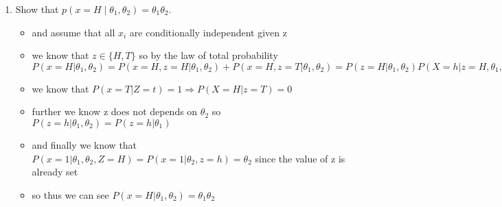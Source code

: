 \documentclass{article}
\theoremstyle{plain}
\theoremstyle{definition}
\begin{document}
\begin{enumerate}
  \setcounter{enumi}{\value{saveenum}}
\item Show that $p(x=H\mid \theta_1, \theta_2) = \theta_1 \theta_2$.
\begin{itemize}
    \color{blue}
    \item and assume that all $x_i$ are conditionally independent given z 
    \item we know that $z\in \{H,T\}$ so by the law of total probability $P(x=H|\theta_1,\theta_2)=P(x=H,z=H|\theta_1, \theta_2)+P(x=H,z=T|\theta_1, \theta_2)=P(z=H|\theta_1, \theta_2)P(X=h|z=H, \theta_1, \theta_2)+P(z=T|\theta_1, \theta_2)P(x=H|z=t,\theta_1, \theta_2)$
    \item we know that $P(x=T|Z=t)=1\Rightarrow P(X=H|z=T)=0$
    \item further we know z does not depends on $\theta_2$ so $P(z=h|\theta_1,\theta_2)=P(z=h|\theta_1)$
    \item and finally we know that $P(x=1|\theta_1, \theta_2, Z=H)=P(x=1|\theta_2, z=h)=\theta_2$ since the value of z is already set
    \item so thus we can see $ P(x=H|\theta_1,\theta_2)=\theta_1\theta_2$
\end{itemize}


\end{enumerate}
\end{document}
